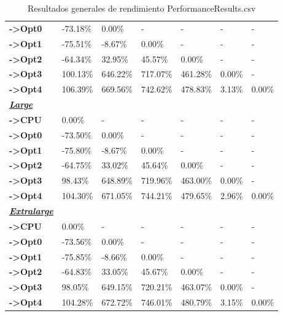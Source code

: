 \begin{table}[H]
\begin{tabular}{lllllll}
    \cellcolor[HTML]{DAE8FC} \textbf{->Opt0} & -73.18\% & 0.00\% & - & - & - & - \\
    \rowcolor[HTML]{EFEFEF} \cellcolor[HTML]{DAE8FC} \textbf{->Opt1} & -75.51\% & -8.67\% & 0.00\% & - & - & - \\
    \cellcolor[HTML]{DAE8FC} \textbf{->Opt2} & -64.34\% & 32.95\% & 45.57\% & 0.00\% & - & - \\
    \rowcolor[HTML]{EFEFEF} \cellcolor[HTML]{DAE8FC} \textbf{->Opt3} & 100.13\% & 646.22\% & 717.07\% & 461.28\% & 	0.00\% & - \\
    \cellcolor[HTML]{DAE8FC} \textbf{->Opt4} & 106.39\% & 669.56\% & 742.62\% & 478.83\% & 	3.13\% & 	0.00\% \\
    \rowcolor[HTML]{EFEFEF} \cellcolor[HTML]{DAE8FC} \textbf{\textbf{{\emph{{\underline{{Large}}}}}}} &  &  &  &  &  &  \\
    \cellcolor[HTML]{DAE8FC} \textbf{->CPU} & 0.00\% & - & - & - & - & - \\
    \rowcolor[HTML]{EFEFEF} \cellcolor[HTML]{DAE8FC} \textbf{->Opt0} & -73.50\% & 0.00\% & - & - & - & - \\
    \cellcolor[HTML]{DAE8FC} \textbf{->Opt1} & -75.80\% & -8.67\% & 0.00\% & - & - & - \\
    \rowcolor[HTML]{EFEFEF} \cellcolor[HTML]{DAE8FC} \textbf{->Opt2} & -64.75\% & 33.02\% & 45.64\% & 0.00\% & - & - \\
    \cellcolor[HTML]{DAE8FC} \textbf{->Opt3} & 98.43\% & 648.89\% & 719.96\% & 463.00\% & 	0.00\% & - \\
    \rowcolor[HTML]{EFEFEF} \cellcolor[HTML]{DAE8FC} \textbf{->Opt4} & 104.30\% & 671.05\% & 744.21\% & 479.65\% & 	2.96\% & 	0.00\% \\
    \cellcolor[HTML]{DAE8FC} \textbf{\textbf{{\emph{{\underline{{Extralarge}}}}}}} &  &  &  &  &  &  \\
    \rowcolor[HTML]{EFEFEF} \cellcolor[HTML]{DAE8FC} \textbf{->CPU} & 0.00\% & - & - & - & - & - \\
    \cellcolor[HTML]{DAE8FC} \textbf{->Opt0} & -73.56\% & 0.00\% & - & - & - & - \\
    \rowcolor[HTML]{EFEFEF} \cellcolor[HTML]{DAE8FC} \textbf{->Opt1} & -75.85\% & -8.66\% & 0.00\% & - & - & - \\
    \cellcolor[HTML]{DAE8FC} \textbf{->Opt2} & -64.83\% & 33.05\% & 45.67\% & 0.00\% & - & - \\
    \rowcolor[HTML]{EFEFEF} \cellcolor[HTML]{DAE8FC} \textbf{->Opt3} & 98.05\% & 649.15\% & 720.21\% & 463.07\% & 	0.00\% & - \\
    \cellcolor[HTML]{DAE8FC} \textbf{->Opt4} & 104.28\% & 672.72\% & 746.01\% & 480.79\% & 	3.15\% & 	0.00\% \\
    \end{tabular}
    \caption[Resultados generales de rendimiento PerformanceResults.csv]{{Resultados generales de rendimiento PerformanceResults.csv}}
    \label{table_global_vectorAdd_PerformanceResults}
\end{table}